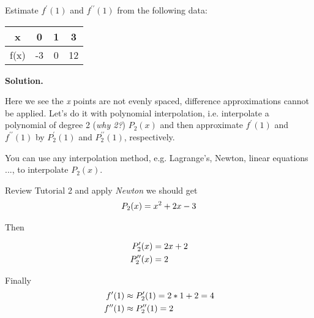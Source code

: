 \begin{exercise}{2} %
Estimate \(f^\prime (1)\) and \(f^{\prime \prime} (1)\) from the following data:

\begin{table}[h]
\centering
\begin{tabular}{|c|c|c|c|}
\hline
x & 0& 1& 3\\ \hline
f(x) & -3 &0 &12 \\ \hline
\end{tabular}
\end{table}

\textbf{Solution.}

Here we see the \textit{x} points are not evenly spaced, difference approximations cannot be applied.
Let's do it with polynomial interpolation, i.e. interpolate a polynomial of degree 2 (\textit{why 2?}) $P_2(x)$ and then approximate  \(f^\prime (1)\) and \(f^{\prime \prime} (1)\) by \(P_2^\prime (1)\) and \(P_2^{\prime \prime} (1)\), respectively.

You can use any interpolation method, e.g. Lagrange's, Newton, linear equations ..., to interpolate $P_2(x)$.

Review Tutorial 2 and apply \textit{Newton} we should get
\begin{align}
P_2(x)= x^2 + 2x -3 \notag
\end{align}

Then 

\begin{align}
P^\prime_2(x)&= 2x+2 \notag \\
P^{\prime\prime}_2(x)&= 2 \notag
\end{align}


Finally 
\begin{align}
f^\prime(1) &\approx P^\prime_2(1)= 2*1+2 = 4 \notag \\
f^{\prime\prime}(1)& \approx P^{\prime\prime}_2(1)= 2 \notag
\end{align}
\end{exercise}


